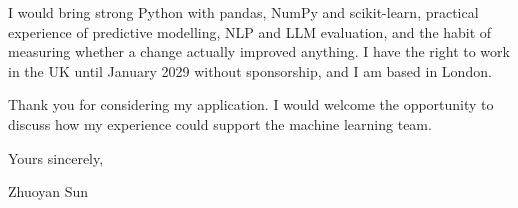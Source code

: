 \documentclass[letterpaper,11pt]{article}
\begin{document}
I would bring strong Python with pandas, NumPy and scikit-learn, practical experience of predictive modelling, NLP and LLM evaluation, and the habit of measuring whether a change actually improved anything. I have the right to work in the UK until January 2029 without sponsorship, and I am based in London.

Thank you for considering my application. I would welcome the opportunity to discuss how my experience could support the machine learning team.

\vspace{2pt}
Yours sincerely,

\vspace{8pt}
Zhuoyan Sun
\end{document}
